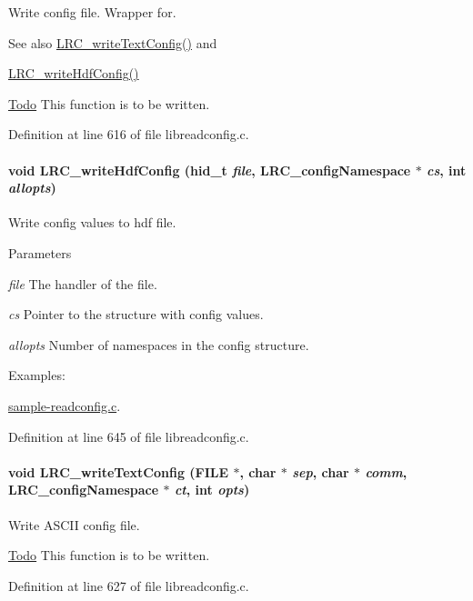 Write config file. Wrapper for. \begin{DoxySeeAlso}{See also}
\hyperlink{group___l_r_c__wrappers_ga42c90a023c4cc3048b39a65245e889e4}{LRC\_\-writeTextConfig()} and 

\hyperlink{group___l_r_c__wrappers_ga142e285d5c8a3e6761d1a86668cfe9eb}{LRC\_\-writeHdfConfig()}
\end{DoxySeeAlso}
\begin{Desc}
\item[\hyperlink{todo__todo000006}{Todo}]This function is to be written. \end{Desc}


Definition at line 616 of file libreadconfig.c.\hypertarget{group___l_r_c__wrappers_ga142e285d5c8a3e6761d1a86668cfe9eb}{
\paragraph[{LRC\_\-writeHdfConfig}]{\setlength{\rightskip}{0pt plus 5cm}void LRC\_\-writeHdfConfig (hid\_\-t {\em file}, \/  {\bf LRC\_\-configNamespace} $\ast$ {\em cs}, \/  int {\em allopts})}\hfill}
\label{group___l_r_c__wrappers_ga142e285d5c8a3e6761d1a86668cfe9eb}


Write config values to hdf file. 
\begin{DoxyParams}{Parameters}
\item[{\em file}]The handler of the file.\item[{\em cs}]Pointer to the structure with config values.\item[{\em allopts}]Number of namespaces in the config structure. \end{DoxyParams}
\begin{Desc}
\item[Examples: ]\par
\hyperlink{sample-readconfig_8c-example}{sample-\/readconfig.c}.\end{Desc}


Definition at line 645 of file libreadconfig.c.\hypertarget{group___l_r_c__wrappers_ga42c90a023c4cc3048b39a65245e889e4}{
\paragraph[{LRC\_\-writeTextConfig}]{\setlength{\rightskip}{0pt plus 5cm}void LRC\_\-writeTextConfig (FILE $\ast$, \/  char $\ast$ {\em sep}, \/  char $\ast$ {\em comm}, \/  {\bf LRC\_\-configNamespace} $\ast$ {\em ct}, \/  int {\em opts})}\hfill}
\label{group___l_r_c__wrappers_ga42c90a023c4cc3048b39a65245e889e4}


Write ASCII config file. \begin{Desc}
\item[\hyperlink{todo__todo000007}{Todo}]This function is to be written. \end{Desc}


Definition at line 627 of file libreadconfig.c.